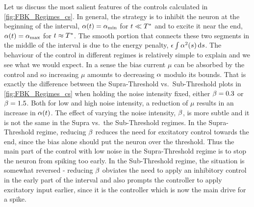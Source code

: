 Let us discuss the most salient features of the controls calculated in
\cref{fig:FBK_Regimes_cs}. In general, the strategy is to inhibit the neuron at
the beginning of the interval, $\alpha(t) = { \alpha_{\textrm{min}} }$ for $t \ll { T^* }$ and to excite it
near the end, $\alpha(t) = { \alpha_{\textrm{max}} }$ for $t \approx { T^* }$. The smooth portion that
connects these two segments in the middle of the interval is due to the energy
penalty, ${\epsilon} \int \alpha^2(s) \, \mathrm{d} s$. The behaviour of the control in different
regimes is relatively simple to explain and we see what we would expect. In a
sense the bias current $\mu$ can be absorbed by the control and so increasing
$\mu$ amounts to decreasing $\alpha$ modulo its bounds. That is exactly the
difference between the Supra-Threshold vs.\ Sub-Threshold plots in
\cref{fig:FBK_Regimes_cs} when holding the noise intensity fixed, either
$\beta=0.3$ or $\beta=1.5$. Both for low and high noise intensity, a reduction of $\mu$
results in an increase in $\alpha(t)$. 
The effect of varying the noise intensity, $\beta$, is more subtle and it is not
the same in the Supra vs.\ the Sub-Threshold regimes. In the
Supra-Threshold regime, reducing $\beta$ reduces the need for
excitatory control towards the end, since the bias alone should put the neuron
over the threshold. Thus the main part of the control with low noise in the
Supra-Threshold regime is to stop the neuron from spiking too early. In the
Sub-Threshold regime, the situation is somewhat reversed - reducing
$\beta$ obviates the need to apply an inhibitory control in the early part of the
interval and also prompts the controller to apply excitatory input earlier,
since it is the controller which is now the main drive for a spike.

